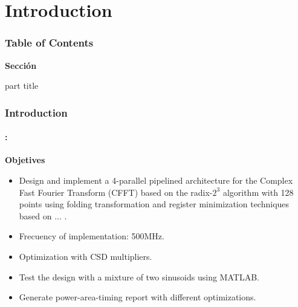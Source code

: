 

\section{Introduction}
\begin{frame}
  \frametitle{\textbf{Table of Contents}}
  \begin{center}
    {\vspace{-1.5cm}\Large \textbf{Sección \thesection}\vspace{0.5cm}}
    \begin{beamercolorbox}[
      sep=8pt,center]{part title}
      \textbf{\insertsection}
    \end{beamercolorbox}
  \end{center}
\end{frame}


\begin{frame}
	\frametitle{\textbf{Introduction}}
	\framesubtitle{\secname : \subsecname}
	\begin{block}{\centering \textbf{Objetives}}
		\begin{itemize} %
  			\item Design and implement a 4-parallel pipelined architecture for the Complex Fast Fourier Transform (CFFT) based on the radix-$2^3$ algorithm with 128 points using folding transformation and register minimization techniques based on ... .
   			\item Frecuency of implementation: 500MHz. 
  			\item Optimization with CSD multipliers.
  			\item Test the design with a mixture of two sinusoids using MATLAB.
  			\item Generate power-area-timing report with different
			optimizations.
  			
  		\end{itemize}
    \end{block}
\end{frame}



